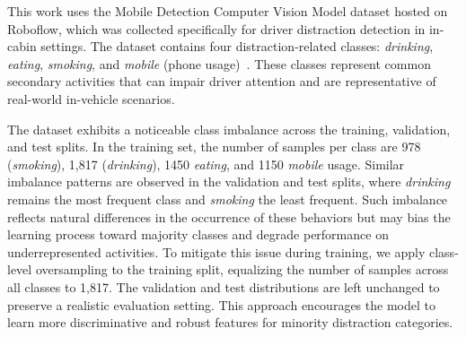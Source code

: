 \documentclass[conference]{IEEEtran}
\begin{document}



This work uses the Mobile Detection Computer Vision Model dataset hosted on Roboflow, which was collected specifically for driver distraction detection in in-cabin settings. The dataset contains four distraction-related classes: \textit{drinking}, \textit{eating}, \textit{smoking}, and \textit{mobile} (phone usage)~\cite{mobile-detection-l2iov_dataset}. These classes represent common secondary activities that can impair driver attention and are representative of real-world in-vehicle scenarios.

The dataset exhibits a noticeable class imbalance across the training, validation, and test splits. In the training set, the number of samples per class are 978 (\textit{smoking}), 1,817 (\textit{drinking}), 1450 \textit{eating}, and 1150 \textit{mobile} usage. Similar imbalance patterns are observed in the validation and test splits, where \textit{drinking} remains the most frequent class and \textit{smoking} the least frequent. Such imbalance reflects natural differences in the occurrence of these behaviors but may bias the learning process toward majority classes and degrade performance on underrepresented activities. To mitigate this issue during training, we apply class-level oversampling to the training split, equalizing the number of samples across all classes to 1,817. The validation and test distributions are left unchanged to preserve a realistic evaluation setting. This approach encourages the model to learn more discriminative and robust features for minority distraction categories.
\end{document}
